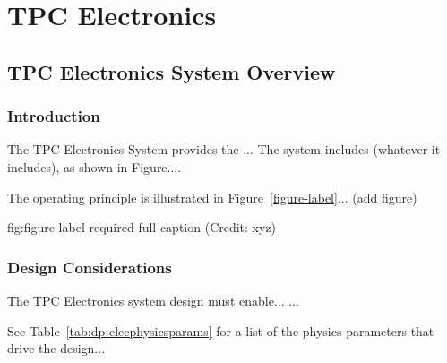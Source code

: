 \chapter{TPC Electronics}
\label{ch:fddp-tpc-elec}

\section{TPC Electronics System Overview}
\label{sec:fddp-tpc-elec-ov}


\subsection{Introduction}
\label{sec:fddp-tpc-elec-intro}

The TPC Electronics System provides the ...
The system includes (whatever it includes), as shown in Figure.... 


The operating principle is illustrated in Figure~\ref{figure-label}... (add figure)

\begin{dunefigure}{fig:figure-label}
{required full caption (Credit: xyz)}
\end{dunefigure}

\subsection{Design Considerations}
\label{sec:fddp-tpc-elec-des-consid}


The TPC Electronics system design must enable... 
...


See Table~\ref{tab:dp-elecphysicsparams} for a list of the physics parameters that drive the design...

